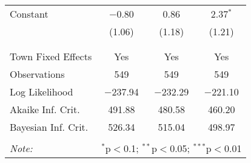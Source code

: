 \begin{table}[!htbp]
\begin{tabular}{@{\extracolsep{5pt}}lccc}
 Constant & $-$0.80 & 0.86 & 2.37$^{*}$ \\ 
  & (1.06) & (1.18) & (1.21) \\ 
  & & & \\ 
\hline \\[-1.8ex] 
Town Fixed Effects & Yes & Yes & Yes \\ 
Observations & 549 & 549 & 549 \\ 
Log Likelihood & $-$237.94 & $-$232.29 & $-$221.10 \\ 
Akaike Inf. Crit. & 491.88 & 480.58 & 460.20 \\ 
Bayesian Inf. Crit. & 526.34 & 515.04 & 498.97 \\ 
\hline 
\hline \\[-1.8ex] 
\textit{Note:}  & \multicolumn{3}{r}{$^{*}$p$<$0.1; $^{**}$p$<$0.05; $^{***}$p$<$0.01} \\ 
\end{tabular} 
\end{table} 

